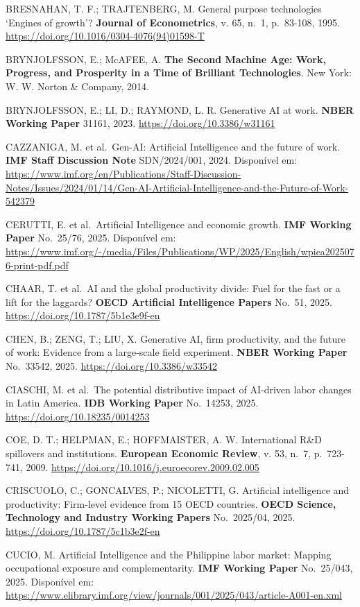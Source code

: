 \documentclass[
  brazilian,
  12pt,
]{article}
\begin{document}
BRESNAHAN, T. F.; TRAJTENBERG, M. General purpose technologies `Engines of growth'? \textbf{Journal of Econometrics}, v. 65, n.~1, p.~83-108, 1995. \url{https://doi.org/10.1016/0304-4076(94)01598-T}

BRYNJOLFSSON, E.; McAFEE, A. \textbf{The Second Machine Age: Work, Progress, and Prosperity in a Time of Brilliant Technologies}. New York: W. W. Norton \& Company, 2014.

BRYNJOLFSSON, E.; LI, D.; RAYMOND, L. R. Generative AI at work. \textbf{NBER Working Paper} 31161, 2023. \url{https://doi.org/10.3386/w31161}

CAZZANIGA, M. et al.~Gen-AI: Artificial Intelligence and the future of work. \textbf{IMF Staff Discussion Note} SDN/2024/001, 2024. Disponível em: \url{https://www.imf.org/en/Publications/Staff-Discussion-Notes/Issues/2024/01/14/Gen-AI-Artificial-Intelligence-and-the-Future-of-Work-542379}

CERUTTI, E. et al.~Artificial Intelligence and economic growth. \textbf{IMF Working Paper} No.~25/76, 2025. Disponível em: \url{https://www.imf.org/-/media/Files/Publications/WP/2025/English/wpiea2025076-print-pdf.pdf}

CHAAR, T. et al.~AI and the global productivity divide: Fuel for the fast or a lift for the laggards? \textbf{OECD Artificial Intelligence Papers} No.~51, 2025. \url{https://doi.org/10.1787/5b1e3e9f-en}

CHEN, B.; ZENG, T.; LIU, X. Generative AI, firm productivity, and the future of work: Evidence from a large-scale field experiment. \textbf{NBER Working Paper} No.~33542, 2025. \url{https://doi.org/10.3386/w33542}

CIASCHI, M. et al.~The potential distributive impact of AI-driven labor changes in Latin America. \textbf{IDB Working Paper} No.~14253, 2025. \url{https://doi.org/10.18235/0014253}

COE, D. T.; HELPMAN, E.; HOFFMAISTER, A. W. International R\&D spillovers and institutions. \textbf{European Economic Review}, v. 53, n.~7, p.~723-741, 2009. \url{https://doi.org/10.1016/j.euroecorev.2009.02.005}

CRISCUOLO, C.; GONCALVES, P.; NICOLETTI, G. Artificial intelligence and productivity: Firm-level evidence from 15 OECD countries. \textbf{OECD Science, Technology and Industry Working Papers} No.~2025/04, 2025. \url{https://doi.org/10.1787/5c1b3e2f-en}

CUCIO, M. Artificial Intelligence and the Philippine labor market: Mapping occupational exposure and complementarity. \textbf{IMF Working Paper} No.~25/043, 2025. Disponível em: \url{https://www.elibrary.imf.org/view/journals/001/2025/043/article-A001-en.xml}
\end{document}
